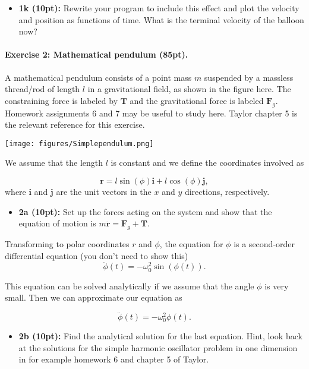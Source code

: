 \documentclass[%
oneside,                 %
final,                   %
10pt]{article}
\begin{document}
\begin{itemize}
\item \textbf{1k (10pt):} Rewrite your program to include this effect and plot the velocity and position as functions of time. What is the terminal velocity of the balloon now?
\end{itemize}

\noindent
\paragraph{Exercise 2: Mathematical pendulum (85pt).}
A mathematical pendulum consists of a point mass $m$ suspended by a
massless thread/rod of length $l$ in a gravitational field, as shown
in the figure here. The constraining force is labeled by $\bm{T}$ and
the gravitational force is labeled $\bm{F}_g$.  Homework assignments 6 and 7 may be useful to study here. Taylor chapter 5 is the relevant reference for this exercise.

\vspace{6mm}

\centerline{\texttt{[image: figures/Simplependulum.png]}}

\vspace{6mm}

We assume that the length $l$ is constant and we define the coordinates involved as

\[
\bm{r} = l\sin(\phi)\bm{i}+l\cos(\phi)\bm{j},
\]
where $\bm{i}$ and $\bm{j}$ are the unit vectors in the $x$ and $y$ directions, respectively.

\begin{itemize}
\item \textbf{2a (10pt):} Set up the forces acting on the system and show that the equation of motion is $m\ddot{\bm{r}}=\bm{F}_g+\bm{T}$.
\end{itemize}

\noindent
Transforming to polar coordinates $r$ and $\phi$, 
the equation for $\phi$ is a second-order differential equation (you don't need to show this)
\[
\ddot{\phi}(t)=-\omega_0^2\sin{(\phi(t))}.
\]

This equation can be solved analytically if we assume that the angle $\phi$ is very small. Then we can approximate our equation as

\[
\ddot{\phi}(t)=-\omega_0^2\phi(t).
\]

\begin{itemize}
\item \textbf{2b (10pt):} Find the analytical solution for the last equation. Hint, look back at the solutions for the simple harmonic oscillator problem in one dimension in for example homework 6 and chapter 5 of Taylor.
\end{itemize}
\end{document}
